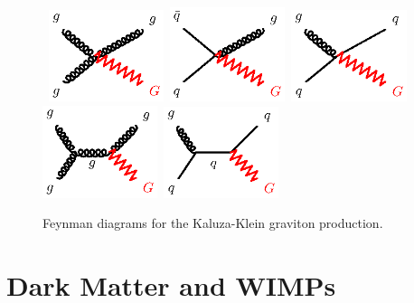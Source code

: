 \begin{figure}[!ht]
\begin{center}
\mbox{
\includegraphics[width=0.3\textwidth]{BeyondSM/Figures/ADD_gggG.eps}
\includegraphics[width=0.3\textwidth]{BeyondSM/Figures/ADD_qqgG.eps}
\includegraphics[width=0.3\textwidth]{BeyondSM/Figures/ADD_qgqG.eps}
}
\mbox{
\includegraphics[width=0.3\textwidth]{BeyondSM/Figures/ADD_ggggG.eps}
\includegraphics[width=0.3\textwidth]{BeyondSM/Figures/ADD_qgqqG.eps}
}
\end{center}
\caption{Feynman diagrams for the Kaluza-Klein graviton production.}
\label{fig:DiagramsADDProduction}
\end{figure}


\section{Dark Matter and WIMPs}
\label{sec:WIMPs}

